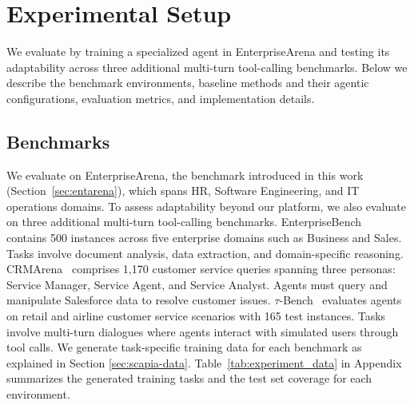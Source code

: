 \documentclass{article}
\theoremstyle{plain}
\theoremstyle{definition}
\theoremstyle{remark}
\begin{document}
\vspace{-0.2cm}

\section{Experimental Setup}
\vspace{-0.2cm}
We evaluate \name{} by training a specialized agent in EnterpriseArena and testing its adaptability across three additional multi-turn tool-calling benchmarks. Below we describe the benchmark environments, baseline methods and their agentic configurations, evaluation metrics, and implementation details.

\vspace{-0.2cm}
\subsection{Benchmarks}
\vspace{-0.2cm}
We evaluate \name{} on EnterpriseArena, the benchmark introduced in this work (Section~\ref{sec:entarena}), which spans HR, Software Engineering, and IT operations domains. To assess adaptability beyond our platform, we also evaluate on three additional multi-turn tool-calling benchmarks.
EnterpriseBench~\cite{vishwakarma2025can} contains 500 instances across five enterprise domains such as Business and Sales. Tasks involve document analysis, data extraction, and domain-specific reasoning.  
CRMArena~\cite{huang2025crmarena} comprises 1,170 customer service queries spanning three personas: Service Manager, Service Agent, and Service Analyst. Agents must query and manipulate Salesforce data to resolve customer issues.  
$\tau$-Bench~\cite{yao2025tau} evaluates agents on retail and airline customer service scenarios with 165 test instances. Tasks involve multi-turn dialogues where agents interact with simulated users through tool calls.
We generate task-specific training data for each benchmark as explained in Section \ref{sec:scapia-data}. Table~\ref{tab:experiment_data} in Appendix summarizes the generated training tasks and the test set coverage for each environment.



\vspace{-0.2cm}
\end{document}
